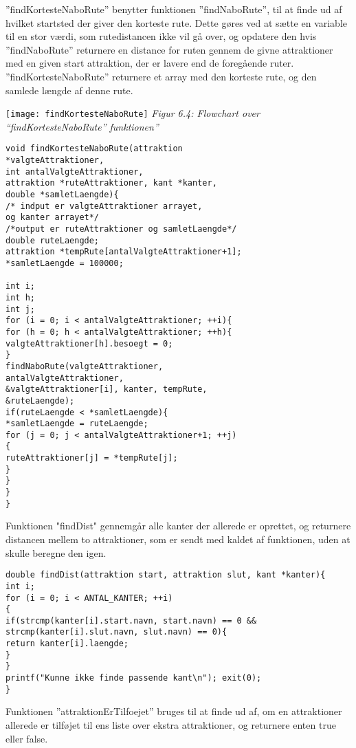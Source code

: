 ”findKortesteNaboRute” benytter funktionen ”findNaboRute”, til at finde ud af hvilket startsted der giver den korteste rute. Dette gøres ved at sætte en variable til en stor værdi, som rutedistancen ikke vil gå over, og opdatere den hvis ”findNaboRute” returnere en distance for ruten gennem de givne attraktioner med en given start attraktion, der er lavere end de foregående ruter. ”findKortesteNaboRute” returnere et array med den korteste rute, og den samlede længde af denne rute.  \newline
\begin{flushleft}
	\texttt{[image: findKortesteNaboRute]}\newline
	\textit{Figur 6.4: Flowchart over “findKortesteNaboRute” funktionen”}
\end{flushleft}
\begin{lstlisting}
void findKortesteNaboRute(attraktion
*valgteAttraktioner, 
int antalValgteAttraktioner, 
attraktion *ruteAttraktioner, kant *kanter, 
double *samletLaengde){
/* indput er valgteAttraktioner arrayet, 
og kanter arrayet*/
/*output er ruteAttraktioner og samletLaengde*/
double ruteLaengde;
attraktion *tempRute[antalValgteAttraktioner+1];
*samletLaengde = 100000;

int i;
int h;
int j;
for (i = 0; i < antalValgteAttraktioner; ++i){
for (h = 0; h < antalValgteAttraktioner; ++h){
valgteAttraktioner[h].besoegt = 0;
}
findNaboRute(valgteAttraktioner,
antalValgteAttraktioner, 
&valgteAttraktioner[i], kanter, tempRute,
&ruteLaengde);
if(ruteLaengde < *samletLaengde){
*samletLaengde = ruteLaengde;
for (j = 0; j < antalValgteAttraktioner+1; ++j)
{
ruteAttraktioner[j] = *tempRute[j];
}
}
}
}
\end{lstlisting}

Funktionen "findDist" gennemgår alle kanter der allerede er oprettet, og returnere distancen mellem to attraktioner, som er sendt med kaldet af funktionen, uden at skulle beregne den igen. \newline

\begin{lstlisting}
double findDist(attraktion start, attraktion slut, kant *kanter){
int i;
for (i = 0; i < ANTAL_KANTER; ++i)
{
if(strcmp(kanter[i].start.navn, start.navn) == 0 && strcmp(kanter[i].slut.navn, slut.navn) == 0){
return kanter[i].laengde;
}
}
printf("Kunne ikke finde passende kant\n"); exit(0);
}
\end{lstlisting}

Funktionen ”attraktionErTilfoejet” bruges til at finde ud af, om en attraktioner allerede er tilføjet til ens liste over ekstra attraktioner, og returnere enten true eller false. \newline

